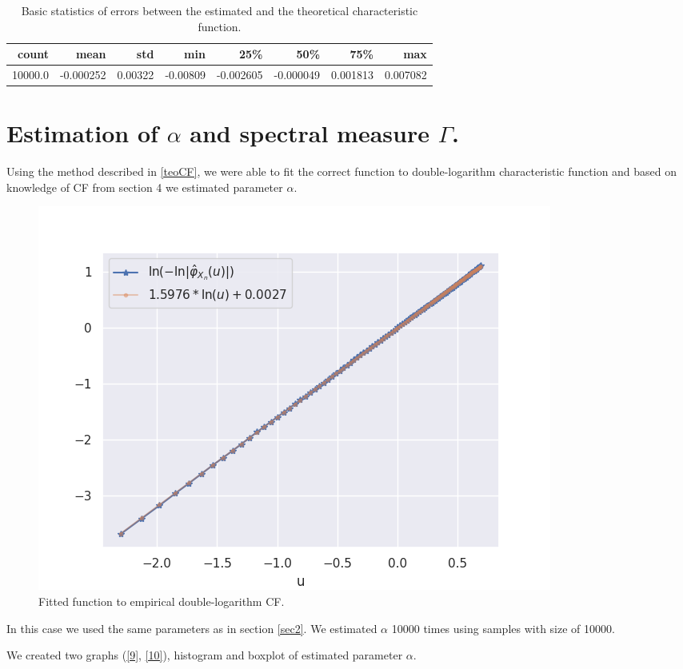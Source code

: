 \documentclass{article}
\begin{document}
	\begin{table}[H]
		\begin{tabular}{rrrrrrrr}
			\hline
			count &      mean &      std &      min &       25\% &       50\% &       75\% &       max \\
			\hline
			10000.0 & -0.000252 &  0.00322 & -0.00809 & -0.002605 & -0.000049 &  0.001813 &  0.007082 \\
			\hline
		\end{tabular}
		\caption{Basic statistics of errors between the estimated and the theoretical characteristic function.}\label{tab1}
	\end{table}
	
	
	\section{Estimation of $\alpha$ and spectral measure $\Gamma$.}
	
	Using the method described in \ref{teoCF}, we were able to fit the correct function to double-logarithm characteristic function and based on knowledge of CF from section 4 we estimated parameter $\alpha$.
	
	\begin{figure}[H]
		\centering
		\includegraphics[width=0.8\linewidth]{images/compare_cf}
		\caption{Fitted function to empirical double-logarithm CF.}\label{11}
	\end{figure}
	In this case we used the same parameters as in section \ref{sec2}. We estimated $\alpha$ 10000 times using samples with size of 10000.
	
	We created two graphs (\ref{9}, \ref{10}), histogram and boxplot of estimated parameter $\alpha$.
	
\end{document}
